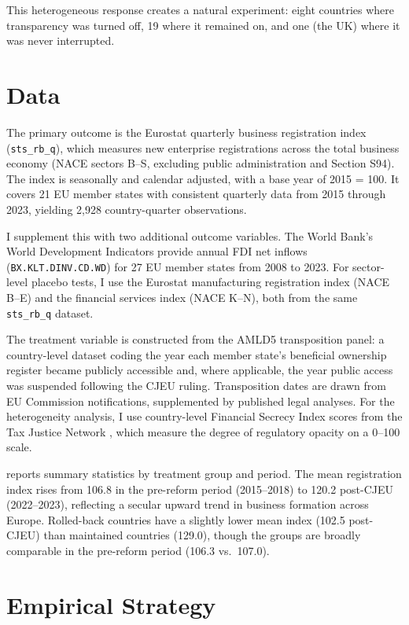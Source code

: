 \documentclass[12pt]{article}
\begin{document}
This heterogeneous response creates a natural experiment: eight countries where transparency was turned off, 19 where it remained on, and one (the UK) where it was never interrupted.


\section{Data}

The primary outcome is the Eurostat quarterly business registration index (\texttt{sts\_rb\_q}), which measures new enterprise registrations across the total business economy (NACE sectors B--S, excluding public administration and Section S94). The index is seasonally and calendar adjusted, with a base year of 2015 = 100. It covers 21 EU member states with consistent quarterly data from 2015 through 2023, yielding 2,928 country-quarter observations.

I supplement this with two additional outcome variables. The World Bank's World Development Indicators provide annual FDI net inflows (\texttt{BX.KLT.DINV.CD.WD}) for 27 EU member states from 2008 to 2023. For sector-level placebo tests, I use the Eurostat manufacturing registration index (NACE B--E) and the financial services index (NACE K--N), both from the same \texttt{sts\_rb\_q} dataset.

The treatment variable is constructed from the AMLD5 transposition panel: a country-level dataset coding the year each member state's beneficial ownership register became publicly accessible and, where applicable, the year public access was suspended following the CJEU ruling. Transposition dates are drawn from EU Commission notifications, supplemented by published legal analyses. For the heterogeneity analysis, I use country-level Financial Secrecy Index scores from the Tax Justice Network \citep{taxjustice2022fsi}, which measure the degree of regulatory opacity on a 0--100 scale.



 reports summary statistics by treatment group and period. The mean registration index rises from 106.8 in the pre-reform period (2015--2018) to 120.2 post-CJEU (2022--2023), reflecting a secular upward trend in business formation across Europe. Rolled-back countries have a slightly lower mean index (102.5 post-CJEU) than maintained countries (129.0), though the groups are broadly comparable in the pre-reform period (106.3 vs.\ 107.0).


\section{Empirical Strategy}
\end{document}
